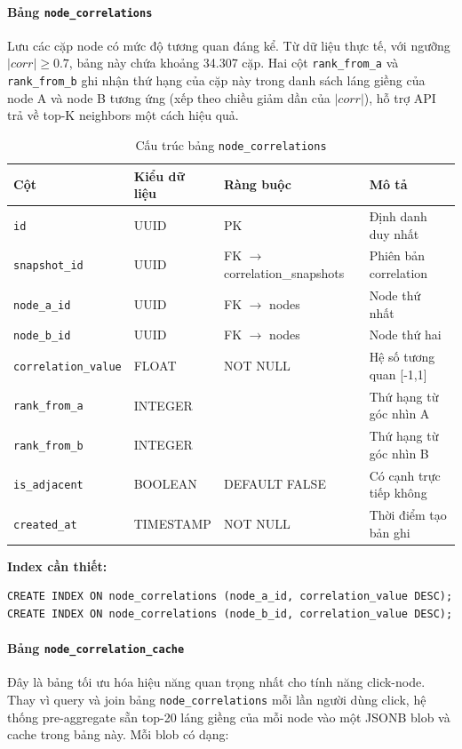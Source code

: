 \paragraph{Bảng \texttt{node\_correlations}}
Lưu các cặp node có mức độ tương quan đáng kể. Từ dữ liệu thực tế, với ngưỡng $|corr| \geq 0.7$, bảng này chứa khoảng 34.307 cặp. Hai cột \texttt{rank\_from\_a} và \texttt{rank\_from\_b} ghi nhận thứ hạng của cặp này trong danh sách láng giềng của node A và node B tương ứng (xếp theo chiều giảm dần của $|corr|$), hỗ trợ API trả về top-K neighbors một cách hiệu quả.

\begin{table}[H]
\centering
\caption{Cấu trúc bảng \texttt{node\_correlations}}
\begin{tabular}{|l|l|l|p{5cm}|}
\hline
\textbf{Cột} & \textbf{Kiểu dữ liệu} & \textbf{Ràng buộc} & \textbf{Mô tả} \\
\hline
\texttt{id} & UUID & PK & Định danh duy nhất \\
\texttt{snapshot\_id} & UUID & FK $\to$ correlation\_snapshots & Phiên bản correlation \\
\texttt{node\_a\_id} & UUID & FK $\to$ nodes & Node thứ nhất \\
\texttt{node\_b\_id} & UUID & FK $\to$ nodes & Node thứ hai \\
\texttt{correlation\_value} & FLOAT & NOT NULL & Hệ số tương quan [-1,1] \\
\texttt{rank\_from\_a} & INTEGER & & Thứ hạng từ góc nhìn A \\
\texttt{rank\_from\_b} & INTEGER & & Thứ hạng từ góc nhìn B \\
\texttt{is\_adjacent} & BOOLEAN & DEFAULT FALSE & Có cạnh trực tiếp không \\
\texttt{created\_at} & TIMESTAMP & NOT NULL & Thời điểm tạo bản ghi \\
\hline
\end{tabular}
\end{table}

\textbf{Index cần thiết:}
\begin{verbatim}
CREATE INDEX ON node_correlations (node_a_id, correlation_value DESC);
CREATE INDEX ON node_correlations (node_b_id, correlation_value DESC);
\end{verbatim}

\paragraph{Bảng \texttt{node\_correlation\_cache}}
Đây là bảng tối ưu hóa hiệu năng quan trọng nhất cho tính năng click-node. Thay vì query và join bảng \texttt{node\_correlations} mỗi lần người dùng click, hệ thống pre-aggregate sẵn top-20 láng giềng của mỗi node vào một JSONB blob và cache trong bảng này. Mỗi blob có dạng:

